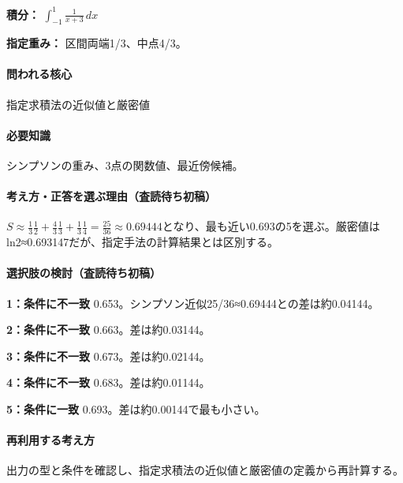 \noindent\textbf{積分：} \(\int_{-1}^{1}\frac{1}{x+3}\,dx\)\par

\noindent\textbf{指定重み：} 区間両端1/3、中点4/3。\par

\paragraph{問われる核心} 指定求積法の近似値と厳密値

\paragraph{必要知識} シンプソンの重み、3点の関数値、最近傍候補。

\paragraph{考え方・正答を選ぶ理由（査読待ち初稿）} \(S\approx\frac13\frac12+\frac43\frac13+\frac13\frac14=\frac{25}{36}\approx0.69444\)となり、最も近い0.693の5を選ぶ。厳密値はln2≈0.693147だが、指定手法の計算結果とは区別する。

\paragraph{選択肢の検討（査読待ち初稿）}\mbox{}\par

\noindent\textbf{1：条件に不一致} 0.653。シンプソン近似25/36≈0.69444との差は約0.04144。\par

\noindent\textbf{2：条件に不一致} 0.663。差は約0.03144。\par

\noindent\textbf{3：条件に不一致} 0.673。差は約0.02144。\par

\noindent\textbf{4：条件に不一致} 0.683。差は約0.01144。\par

\noindent\textbf{5：条件に一致} 0.693。差は約0.00144で最も小さい。\par

\paragraph{再利用する考え方} 出力の型と条件を確認し、指定求積法の近似値と厳密値の定義から再計算する。

